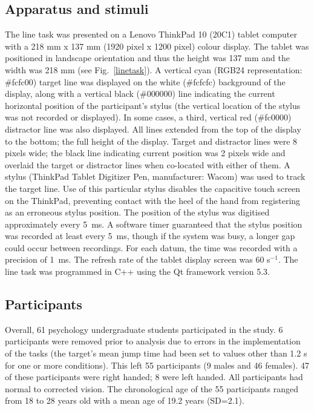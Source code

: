 \documentclass[10pt,letterpaper]{article}
\begin{document}
\subsection*{Apparatus and stimuli}
The line task was presented on a Lenovo ThinkPad 10 (20C1) tablet
computer with a 218 mm x 137 mm (1920 pixel x 1200 pixel) colour
display. The tablet was positioned in landscape orientation and thus
the height was 137 mm and the width was 218 mm (see
Fig.~\ref{linetask}). A vertical cyan (RGB24 representation: \#fcfc00)
target line was displayed on the white (\#fcfcfc) background of the
display, along with a vertical black (\#000000) line indicating the
current horizontal position of the participant's stylus (the vertical
location of the stylus was not recorded or displayed). In some cases,
a third, vertical red (\#fc0000) distractor line was also
displayed. All lines extended from the top of the display to the
bottom; the full height of the display. Target and distractor lines
were 8 pixels wide; the black line indicating current position was 2
pixels wide and overlaid the target or distractor lines when
co-located with either of them. A stylus (ThinkPad Tablet Digitizer
Pen, manufacturer: Wacom) was used to track the target line. Use of
this particular stylus disables the capacitive touch screen on the
ThinkPad, preventing contact with the heel of the hand from
registering as an erroneous stylus position. The position of the
stylus was digitised approximately every 5~ms. A software timer
guaranteed that the stylus position was recorded at least every 5~ms,
though if the system was busy, a longer gap could occur between
recordings. For each datum, the time was recorded with a precision of
1~ms.
The refresh rate of the tablet display screen was 60 s$^{-1}$. The line
task was programmed in C++ using the Qt framework version 5.3.

\subsection*{Participants}
Overall, 61 psychology undergraduate students participated in the
study. 6 participants were removed prior to analysis due to errors in
the implementation of the tasks (the target's mean jump time had been
set to values other than 1.2 s for one or more conditions). This left
55 participants (9 males and 46 females). 47 of these participants
were right handed; 8 were left handed. All participants
had normal to corrected vision. The chronological age of the 55
participants ranged from 18 to 28 years old with a mean age of 19.2
years (SD=2.1).
\end{document}
